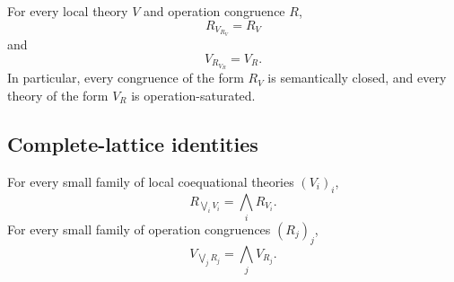 \begin{corollary}
\label{cor:to-galois-triangle-identities}
    For every local theory \(V\) and operation congruence \(R\),
    \[
        R_{V_{R_V}}=R_V
    \]
    and
    \[
        V_{R_{V_R}}=V_R.
    \]
    In particular, every congruence of the form \(R_V\) is semantically
    closed, and every theory of the form \(V_R\) is operation-saturated.
\end{corollary}

\subsection{Complete-lattice identities}
\label{subsec:to-complete-lattice-identities}

\begin{theorem}
\label{thm:to-galois-join-formulas}
    For every small family of local coequational theories \((V_i)_i\),
    \[
        R_{\bigvee_iV_i}
        =
        \bigwedge_iR_{V_i}.
    \]
    For every small family of operation congruences \((R_j)_j\),
    \[
        V_{\bigvee_jR_j}
        =
        \bigwedge_jV_{R_j}.
    \]
\end{theorem}

